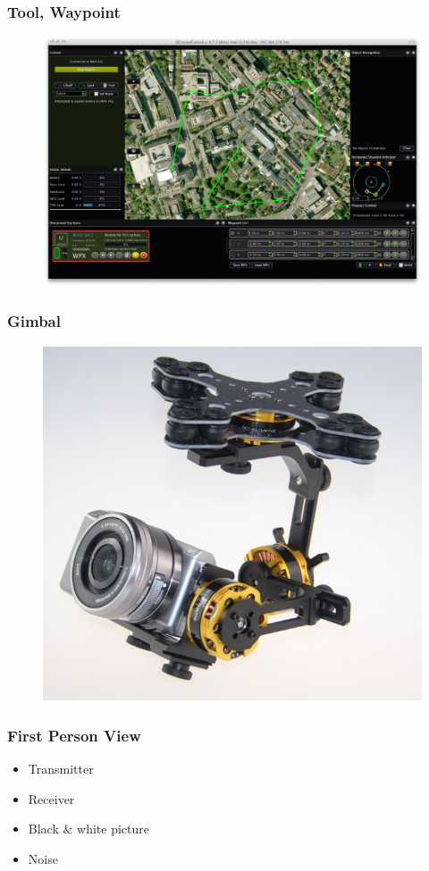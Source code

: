 \begin{frame}
\frametitle{Tool, Waypoint}

  \begin{figure}
  \includegraphics[scale=0.2]{pic/03_our-copter/qgroundcontrol.png}
  \end{figure}
  
\end{frame}



\begin{frame}
\frametitle{Gimbal}

  \begin{figure}
  \includegraphics[scale=0.4]{pic/03_our-copter/gimbal.jpg}
  \end{figure}
  
\end{frame}



\begin{frame}
\frametitle{First Person View}

  \begin{itemize}
    \item Transmitter    
    \item Receiver   
	\item Black \& white picture
	\item Noise 
  \end{itemize}
  
\end{frame}







